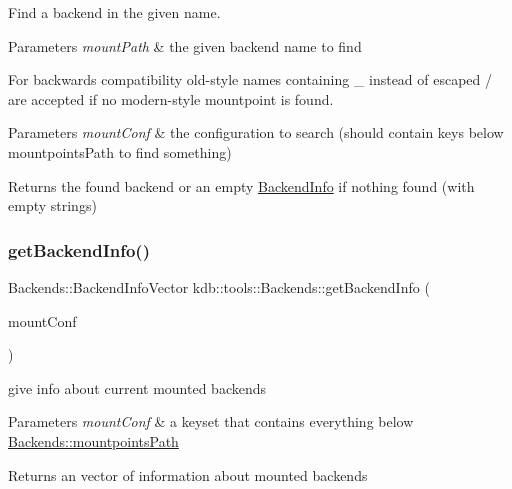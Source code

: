 Find a backend in the given name. 


\begin{DoxyParams}{Parameters}
{\em mount\+Path} & the given backend name to find\\
\hline
\end{DoxyParams}
For backwards compatibility old-\/style names containing \+\_\+ instead of escaped / are accepted if no modern-\/style mountpoint is found.


\begin{DoxyParams}{Parameters}
{\em mount\+Conf} & the configuration to search (should contain keys below mountpoints\+Path to find something)\\
\hline
\end{DoxyParams}
\begin{DoxyReturn}{Returns}
the found backend or an empty \mbox{\hyperlink{structkdb_1_1tools_1_1BackendInfo}{Backend\+Info}} if nothing found (with empty strings) 
\end{DoxyReturn}
\mbox{\label{classkdb_1_1tools_1_1Backends_a82b334d8a1e01df664462c6dd43bd7e1}} 
\subsubsection{\texorpdfstring{getBackendInfo()}{getBackendInfo()}}
{\footnotesize\ttfamily Backends\+::\+Backend\+Info\+Vector kdb\+::tools\+::\+Backends\+::get\+Backend\+Info (\begin{DoxyParamCaption}\item[{\mbox{\hyperlink{classkdb_1_1KeySet}{Key\+Set}}}]{mount\+Conf }\end{DoxyParamCaption})\hspace{0.3cm}{\ttfamily [static]}}



give info about current mounted backends 


\begin{DoxyParams}{Parameters}
{\em mount\+Conf} & a keyset that contains everything below \mbox{\hyperlink{classkdb_1_1tools_1_1Backends_ac867850accaab4fda286f763cacc3926}{Backends\+::mountpoints\+Path}}\\
\hline
\end{DoxyParams}
\begin{DoxyReturn}{Returns}
an vector of information about mounted backends 
\end{DoxyReturn}
\mbox{\label{classkdb_1_1tools_1_1Backends_a76af9122c56426f4d0119e44719c7309}} 
